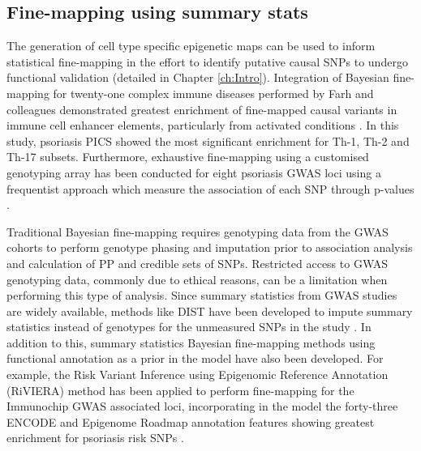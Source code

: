 \subsection{Fine-mapping using summary stats}

The generation of cell type specific epigenetic maps can be used to inform statistical fine-mapping in the effort to identify putative causal SNPs to undergo functional validation (detailed in Chapter \ref{ch:Intro}). Integration of Bayesian fine-mapping for twenty-one complex immune diseases performed by Farh and colleagues demonstrated greatest enrichment of fine-mapped causal variants in immune cell enhancer elements, particularly from activated conditions \parencite{Farh2015}. In this study, psoriasis PICS showed the most significant enrichment for Th-1, Th-2 and Th-17 subsets. Furthermore, exhaustive fine-mapping using a customised genotyping array has been conducted for eight psoriasis GWAS loci using a frequentist approach which measure the association of each SNP through p-values \parencite{Das2014}.

Traditional Bayesian fine-mapping requires genotyping data from the GWAS cohorts to perform genotype phasing and imputation prior to association analysis and calculation of PP and credible sets of SNPs. Restricted access to GWAS genotyping data, commonly due to ethical reasons, can be a limitation when performing this type of analysis. Since summary statistics from GWAS studies are widely available, methods like DIST have been developed to impute summary statistics instead of genotypes for the unmeasured SNPs in the study \parencite{Lee2013}. In addition to this, summary statistics Bayesian fine-mapping methods using functional annotation as a prior in the model have also been developed. For example, the Risk Variant Inference using Epigenomic Reference Annotation (RiVIERA) method has been applied to perform fine-mapping for the Immunochip GWAS associated loci, incorporating in the model the forty-three ENCODE and Epigenome Roadmap annotation features showing greatest enrichment for psoriasis risk SNPs \parencite{Li2016}. 



